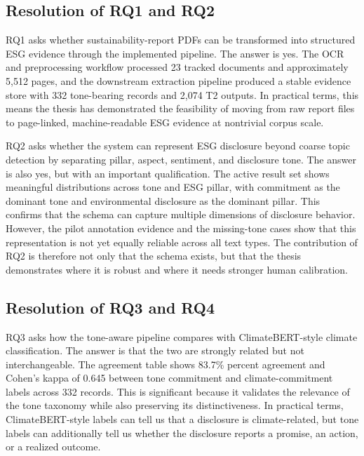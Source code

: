 \subsection{Resolution of RQ1 and RQ2}

RQ1 asks whether sustainability-report PDFs can be transformed into structured ESG evidence through the implemented pipeline. The answer is yes. The OCR and preprocessing workflow processed 23 tracked documents and approximately 5,512 pages, and the downstream extraction pipeline produced a stable evidence store with 332 tone-bearing records and 2,074 T2 outputs. In practical terms, this means the thesis has demonstrated the feasibility of moving from raw report files to page-linked, machine-readable ESG evidence at nontrivial corpus scale.

RQ2 asks whether the system can represent ESG disclosure beyond coarse topic detection by separating pillar, aspect, sentiment, and disclosure tone. The answer is also yes, but with an important qualification. The active result set shows meaningful distributions across tone and ESG pillar, with commitment as the dominant tone and environmental disclosure as the dominant pillar. This confirms that the schema can capture multiple dimensions of disclosure behavior. However, the pilot annotation evidence and the missing-tone cases show that this representation is not yet equally reliable across all text types. The contribution of RQ2 is therefore not only that the schema exists, but that the thesis demonstrates where it is robust and where it needs stronger human calibration.
\subsection{Resolution of RQ3 and RQ4}

RQ3 asks how the tone-aware pipeline compares with ClimateBERT-style climate classification. The answer is that the two are strongly related but not interchangeable. The agreement table shows 83.7\% percent agreement and Cohen’s kappa of 0.645 between tone commitment and climate-commitment labels across 332 records. This is significant because it validates the relevance of the tone taxonomy while also preserving its distinctiveness. In practical terms, ClimateBERT-style labels can tell us that a disclosure is climate-related, but tone labels can additionally tell us whether the disclosure reports a promise, an action, or a realized outcome.

